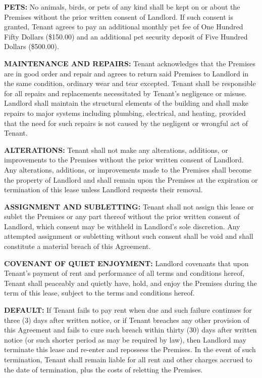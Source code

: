 \documentclass[12pt,letterpaper]{article}
\begin{document}
\vspace{0.2cm}
\noindent \textbf{PETS:} No animals, birds, or pets of any kind shall be kept on or about the Premises without the prior written consent of Landlord. If such consent is granted, Tenant agrees to pay an additional monthly pet fee of One Hundred Fifty Dollars (\$150.00) and an additional pet security deposit of Five Hundred Dollars (\$500.00).

\vspace{0.2cm}
\noindent \textbf{MAINTENANCE AND REPAIRS:} Tenant acknowledges that the Premises are in good order and repair and agrees to return said Premises to Landlord in the same condition, ordinary wear and tear excepted. Tenant shall be responsible for all repairs and replacements necessitated by Tenant's negligence or misuse. Landlord shall maintain the structural elements of the building and shall make repairs to major systems including plumbing, electrical, and heating, provided that the need for such repairs is not caused by the negligent or wrongful act of Tenant.

\vspace{0.2cm}
\noindent \textbf{ALTERATIONS:} Tenant shall not make any alterations, additions, or improvements to the Premises without the prior written consent of Landlord. Any alterations, additions, or improvements made to the Premises shall become the property of Landlord and shall remain upon the Premises at the expiration or termination of this lease unless Landlord requests their removal.

\vspace{0.2cm}
\noindent \textbf{ASSIGNMENT AND SUBLETTING:} Tenant shall not assign this lease or sublet the Premises or any part thereof without the prior written consent of Landlord, which consent may be withheld in Landlord's sole discretion. Any attempted assignment or subletting without such consent shall be void and shall constitute a material breach of this Agreement.

\vspace{0.2cm}
\noindent \textbf{COVENANT OF QUIET ENJOYMENT:} Landlord covenants that upon Tenant's payment of rent and performance of all terms and conditions hereof, Tenant shall peaceably and quietly have, hold, and enjoy the Premises during the term of this lease, subject to the terms and conditions hereof.

\vspace{0.2cm}
\noindent \textbf{DEFAULT:} If Tenant fails to pay rent when due and such failure continues for three (3) days after written notice, or if Tenant breaches any other provision of this Agreement and fails to cure such breach within thirty (30) days after written notice (or such shorter period as may be required by law), then Landlord may terminate this lease and re-enter and repossess the Premises. In the event of such termination, Tenant shall remain liable for all rent and other charges accrued to the date of termination, plus the costs of reletting the Premises.
\end{document}
